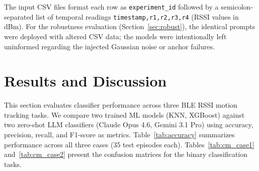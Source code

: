 \documentclass[conference]{IEEEtran}
\begin{document}
The input CSV files format each row as \texttt{experiment\_id} followed by a semicolon-separated list of temporal readings \texttt{timestamp,r1,r2,r3,r4} (RSSI values in dBm). For the robustness evaluation (Section~\ref{sec:robust}), the identical prompts were deployed with altered CSV data; the models were intentionally left uninformed regarding the injected Gaussian noise or anchor failures.

\section{Results and Discussion}

This section evaluates classifier performance across three BLE RSSI motion tracking tasks. We compare two trained ML models (KNN, XGBoost) against two zero-shot LLM classifiers (Claude Opus 4.6, Gemini 3.1 Pro) using accuracy, precision, recall, and F1-score as metrics. Table~\ref{tab:accuracy} summarizes performance across all three cases (35 test episodes each). Tables~\ref{tab:cm_case1} and~\ref{tab:cm_case2} present the confusion matrices for the binary classification tasks.
\end{document}
